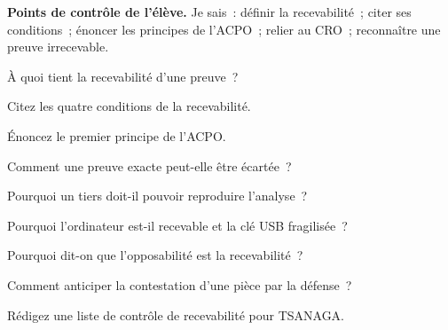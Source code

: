 \begin{boxinfo}
\textbf{Points de contrôle de l'élève.} Je sais~: définir la recevabilité~;
citer ses conditions~; énoncer les principes de l'ACPO~; relier au CRO~;
reconnaître une preuve irrecevable.
\end{boxinfo}

\bigskip

\begin{boxexo}[title={\ding{45}\quad Exercice~6.1. Définir \niveaubase}]
À quoi tient la recevabilité d'une preuve~?
\end{boxexo}

\begin{boxexo}[title={\ding{45}\quad Exercice~6.2. Conditions \niveaubase}]
Citez les quatre conditions de la recevabilité.
\end{boxexo}

\begin{boxexo}[title={\ding{45}\quad Exercice~6.3. ACPO \niveaubase}]
Énoncez le premier principe de l'ACPO.
\end{boxexo}

\begin{boxexo}[title={\ding{45}\quad Exercice~6.4. Exacte mais écartée \niveaumoyen}]
Comment une preuve exacte peut-elle être écartée~?
\end{boxexo}

\begin{boxexo}[title={\ding{45}\quad Exercice~6.5. Reproductible \niveaumoyen}]
Pourquoi un tiers doit-il pouvoir reproduire l'analyse~?
\end{boxexo}

\begin{boxexo}[title={\ding{45}\quad Exercice~6.6. Deux pièces \niveaumoyen}]
Pourquoi l'ordinateur est-il recevable et la clé USB fragilisée~?
\end{boxexo}

\begin{boxexo}[title={\ding{45}\quad Exercice~6.7. CRO \niveaumoyen}]
Pourquoi dit-on que l'opposabilité est la recevabilité~?
\end{boxexo}

\begin{boxexo}[title={\ding{45}\quad Exercice~6.8. Anticiper \niveaumoyen}]
Comment anticiper la contestation d'une pièce par la défense~?
\end{boxexo}

\begin{boxexo}[title={\ding{45}\quad Exercice~6.9. Liste de contrôle \niveauexpert}]
Rédigez une liste de contrôle de recevabilité pour TSANAGA.
\end{boxexo}

